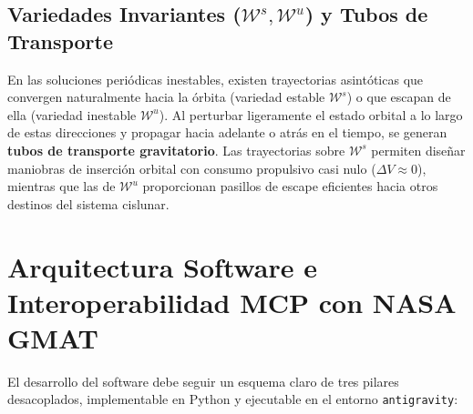 \documentclass[11pt, a4paper]{article}
\begin{document}
	\subsection{\texorpdfstring{Variedades Invariantes ($\mathcal{W}^s, \mathcal{W}^u$)}{Variedades Invariantes (Ws, Wu)} y Tubos de Transporte}
	En las soluciones periódicas inestables, existen trayectorias asintóticas que convergen naturalmente hacia la órbita (variedad estable $\mathcal{W}^s$) o que escapan de ella (variedad inestable $\mathcal{W}^u$). Al perturbar ligeramente el estado orbital a lo largo de estas direcciones y propagar hacia adelante o atrás en el tiempo, se generan \textbf{tubos de transporte gravitatorio}. Las trayectorias sobre $\mathcal{W}^s$ permiten diseñar maniobras de inserción orbital con consumo propulsivo casi nulo ($\Delta V \approx 0$), mientras que las de $\mathcal{W}^u$ proporcionan pasillos de escape eficientes hacia otros destinos del sistema cislunar.
	
	\section{Arquitectura Software e Interoperabilidad MCP con NASA GMAT}
	
	El desarrollo del software debe seguir un esquema claro de tres pilares desacoplados, implementable en Python y ejecutable en el entorno \texttt{antigravity}:
	
\end{document}
